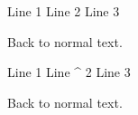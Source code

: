 \documentclass{article}
\begin{document}
\begin{linebyline}
    Line 1
    Line 2
    Line 3
\end{linebyline}

Back to
normal
text.

\begin{linebyline}
    Line 1
    Line ^ 2
    Line 3
\end{linebyline}

Back to %
normal
text.
\end{document}
